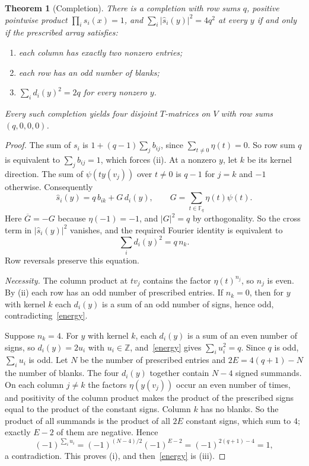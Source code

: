 \documentclass[11pt]{article}
\newtheorem{theorem}{Theorem}
\theoremstyle{remark}
\newcommand{\F}{\mathbb F}
\begin{document}
\begin{theorem}[Completion]\label{completion}
There is a completion with row sums $q$, positive pointwise product $\prod_i s_i(x)=1$, and $\sum_i|\widehat s_i(y)|^2=4q^2$ at every $y$ if and only if the prescribed array satisfies:
\begin{enumerate}
\item[\rm(i)] each column has exactly two nonzero entries;
\item[\rm(ii)] each row has an odd number of blanks;
\item[\rm(iii)] $\sum_i d_i(y)^2=2q$ for every nonzero $y$.
\end{enumerate}
Every such completion yields four disjoint $T$-matrices on $V$ with row sums $(q,0,0,0)$.
\end{theorem}

\begin{proof}
The sum of $s_i$ is $1+(q-1)\sum_j b_{ij}$, since $\sum_{t\ne0}\eta(t)=0$. So row sum $q$ is equivalent to $\sum_j b_{ij}=1$, which forces (ii). At a nonzero $y$, let $k$ be its kernel direction. The sum of $\psi(ty(v_j))$ over $t\ne0$ is $q-1$ for $j=k$ and $-1$ otherwise. Consequently
\begin{equation}\label{gauss}
 \widehat s_i(y)=q\,b_{ik}+G\,d_i(y),\qquad G=\sum_{t\in\F_q}\eta(t)\psi(t).
\end{equation}
Here $\overline G=-G$ because $\eta(-1)=-1$, and $|G|^2=q$ by orthogonality. So the cross term in $|\widehat s_i(y)|^2$ vanishes, and the required Fourier identity is equivalent to
\begin{equation}\label{energy}
 \sum_i d_i(y)^2=q\,n_k .
\end{equation}
Row reversals preserve this equation.

\emph{Necessity.} The column product at $tv_j$ contains the factor $\eta(t)^{n_j}$, so $n_j$ is even. By (ii) each row has an odd number of prescribed entries. If $n_k=0$, then for $y$ with kernel $k$ each $d_i(y)$ is a sum of an odd number of signs, hence odd, contradicting~\eqref{energy}.

Suppose $n_k=4$. For $y$ with kernel $k$, each $d_i(y)$ is a sum of an even number of signs, so $d_i(y)=2u_i$ with $u_i\in\mathbb Z$, and~\eqref{energy} gives $\sum_iu_i^2=q$. Since $q$ is odd, $\sum_iu_i$ is odd. Let $N$ be the number of prescribed entries and $2E=4(q+1)-N$ the number of blanks. The four $d_i(y)$ together contain $N-4$ signed summands. On each column $j\ne k$ the factors $\eta(y(v_j))$ occur an even number of times, and positivity of the column product makes the product of the prescribed signs equal to the product of the constant signs. Column $k$ has no blanks. So the product of all summands is the product of all $2E$ constant signs, which sum to $4$; exactly $E-2$ of them are negative. Hence
\[
 (-1)^{\sum_iu_i}=(-1)^{(N-4)/2}(-1)^{E-2}=(-1)^{2(q+1)-4}=1,
\]
a contradiction. This proves (i), and then~\eqref{energy} is (iii).


\end{proof}
\end{document}
